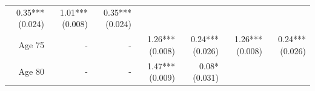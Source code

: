 \documentclass[]{article}
\begin{document}
\begin{longtable}[c]{@{}rrrrrrr@{}}
\begin{minipage}[t]{0.12\columnwidth}\raggedleft\strut
0.35*** (0.024)
\strut\end{minipage} &
\begin{minipage}[t]{0.11\columnwidth}\raggedleft\strut
1.01*** (0.008)
\strut\end{minipage} &
\begin{minipage}[t]{0.11\columnwidth}\raggedleft\strut
0.35*** (0.024)
\strut\end{minipage}\tabularnewline
\begin{minipage}[t]{0.12\columnwidth}\raggedleft\strut
Age 75
\strut\end{minipage} &
\begin{minipage}[t]{0.11\columnwidth}\raggedleft\strut
-
\strut\end{minipage} &
\begin{minipage}[t]{0.12\columnwidth}\raggedleft\strut
-
\strut\end{minipage} &
\begin{minipage}[t]{0.11\columnwidth}\raggedleft\strut
1.26*** (0.008)
\strut\end{minipage} &
\begin{minipage}[t]{0.12\columnwidth}\raggedleft\strut
0.24*** (0.026)
\strut\end{minipage} &
\begin{minipage}[t]{0.11\columnwidth}\raggedleft\strut
1.26*** (0.008)
\strut\end{minipage} &
\begin{minipage}[t]{0.11\columnwidth}\raggedleft\strut
0.24*** (0.026)
\strut\end{minipage}\tabularnewline
\begin{minipage}[t]{0.12\columnwidth}\raggedleft\strut
Age 80
\strut\end{minipage} &
\begin{minipage}[t]{0.11\columnwidth}\raggedleft\strut
-
\strut\end{minipage} &
\begin{minipage}[t]{0.12\columnwidth}\raggedleft\strut
-
\strut\end{minipage} &
\begin{minipage}[t]{0.11\columnwidth}\raggedleft\strut
1.47*** (0.009)
\strut\end{minipage} &
\begin{minipage}[t]{0.12\columnwidth}\raggedleft\strut
0.08* (0.031)
\strut\end{minipage} &
\begin{minipage}[t]{0.11\columnwidth}\raggedleft\strut

\end{minipage}
\end{longtable}
\end{document}
